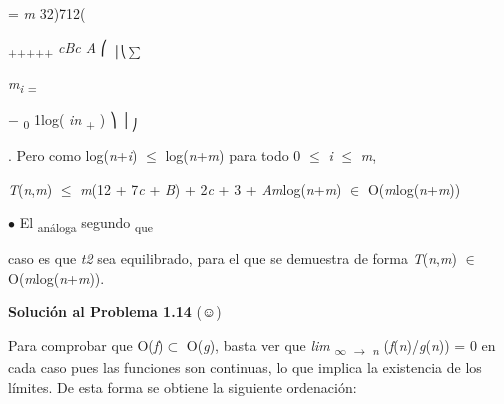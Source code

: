 \documentclass[12pt]{article}
\renewcommand{\_}{\kern-1.5pt\textunderscore\kern-1.5pt}
\begin{document}
{\fontsize{10pt}{12.0pt}\selectfont = \textit{m }32)712( \par}\par

\textsubscript{+++++ }\textit{cBc A }⎛ \textsubscript{│⎝$ \sum $ }{\fontsize{7pt}{8.4pt}\selectfont \textit{m\textsubscript{i }}\textsubscript{= }\par}\par

{\fontsize{6pt}{7.2pt}\selectfont $-$ \textsubscript{0 }1log( \textit{in }\textsubscript{+ }) ⎞ │\textsubscript{⎠}{\fontsize{10pt}{12.0pt}\selectfont . Pero como log(\textit{n}+\textit{i}) $ \leq $  log(\textit{n}+\textit{m}) para todo 0 $ \leq $  \textit{i }$ \leq $  \textit{m}, \par}\par}\par

{\fontsize{10pt}{12.0pt}\selectfont \textit{T}(\textit{n},\textit{m}) $ \leq $  \textit{m}(12 + 7\textit{c }+ \textit{B}) + 2\textit{c }+ 3 + \textit{Am}log(\textit{n}+\textit{m}) $ \in $  O(\textit{m}log(\textit{n}+\textit{m})) \par}\par

{\fontsize{10pt}{12.0pt}\selectfont $\bullet$  El \textsubscript{análoga }segundo \textsubscript{que }\par}\par

{\fontsize{10pt}{12.0pt}\selectfont caso es que \textit{t2 }sea equilibrado, para el que se demuestra de forma \textit{T}(\textit{n},\textit{m}) $ \in $  O(\textit{m}log(\textit{n}+\textit{m})). \par}\par

{\fontsize{10pt}{12.0pt}\selectfont \textbf{Solución al Problema 1.14 }(☺) \par}\par

\begin{justify}
{\fontsize{10pt}{12.0pt}\selectfont Para comprobar que O(\textit{f})$ \subset $ O(\textit{g}), basta ver que \textit{lim }\textsubscript{$\infty$ $ \rightarrow $ \textit{n }}(\textit{f}(\textit{n})/\textit{g}(\textit{n})) = 0 en cada caso pues las funciones son continuas, lo que implica la existencia de los límites. De esta forma se obtiene la siguiente ordenación: \par}
\end{justify}\par
\end{document}
